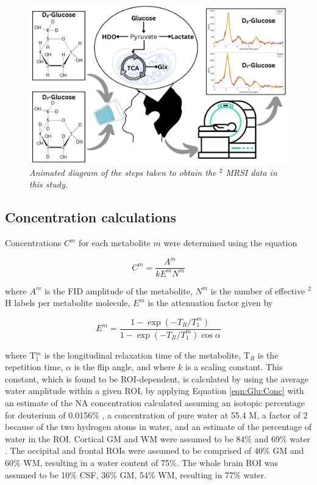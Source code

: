 \begin{figure}
    \centering
    \includegraphics[width = 1\textwidth]{Figures/Glucose/Study_Day.png}
    \caption{\textit{Animated diagram of the steps taken to obtain the $^2$ MRSI data in this study.}}
    \label{fig:Glu:Study_Day}
\end{figure}

\subsection{Concentration calculations}

Concentrations $C^m$ for each metabolite $m$ were determined using the equation

\begin{equation}
    C^m = \frac{A^m}{kE^mN^m}
    \label{eqn:Glu:Conc}
\end{equation}

where $A^m$ is the FID amplitude of the metabolite, $N^m$ is the number of effective $^2$H labels per metabolite molecule, $E^m$ is the attenuation factor given by

\begin{equation}
    E^m = \frac{1-\exp(-T_R/T_1^m)}{1-\exp(-T_R/T_1^m)\cos{\alpha}}
    \label{eqn:Glu:Atte}
\end{equation}

where T$_1^m$ is the longitudinal relaxation time of the metabolite, T$_R$ is the repetition time, $\alpha$ is the flip angle, and where $k$ is a scaling constant. This constant, which is found to be \ac{ROI}-dependent, is calculated by using the average water amplitude within a given \ac{ROI}, by applying Equation \ref{eqn:Glu:Conc} with an estimate of the \ac{NA} concentration calculated assuming an isotopic percentage for deuterium of 0.0156\% \cite{Hagemann1970AbsoluteSMOW}, a concentration of pure water at 55.4 M, a factor of 2 because of the two hydrogen atoms in water, and an estimate of the percentage of water in the \ac{ROI}. Cortical \ac{GM} and \ac{WM} were assumed to be 84\% and 69\% water \cite{Oros-Peusquens2019AImplications}. The occipital and frontal \ac{ROI}s were assumed to be comprised of 40\% \ac{GM} and 60\% \ac{WM}, resulting in a water content of 75\%. The whole brain \ac{ROI} was assumed to be 10\% \ac{CSF}, 36\% \ac{GM}, 54\% \ac{WM}, resulting in 77\% water.

